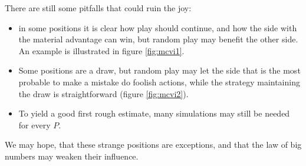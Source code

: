 There are still some pitfalls that could ruin the joy:
\begin{itemize}
\item in some positions it is clear how play should continue, and how the side with the material advantage can win, but random play may benefit the other side. An example is illustrated in figure \ref{fig:mcvi1}.
\item Some positions are a draw, but random play may let the side that is the most probable to make a mistake do foolish actions, while the strategy maintaining the draw is straightforward (figure \ref{fig:mcvi2}).
\item To yield a good first rough estimate, many simulations may still be needed for every $P$.
\end{itemize}
We may hope, that these strange positions are exceptions, and that the law of big numbers may weaken their influence.

